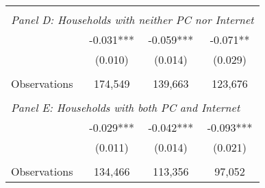 {\begin{tabular}{lccc}
&  &  &   \\
\multicolumn{4}{l}{\textit{Panel D: Households with neither PC nor Internet}} \\
\hspace{3mm}        &      -0.031***&      -0.059***&      -0.071** \\
                    &     (0.010)   &     (0.014)   &     (0.029)   \\
                    &               &               &               \\
\hspace{3mm}Observations&     174,549   &     139,663   &     123,676   \\
 
&  &  &   \\
\multicolumn{4}{l}{\textit{Panel E: Households with both PC and Internet}} \\
\hspace{3mm}        &      -0.029***&      -0.042***&      -0.093***\\
                    &     (0.011)   &     (0.014)   &     (0.021)   \\
                    &               &               &               \\
\hspace{3mm}Observations&     134,466   &     113,356   &      97,052   \\
 

\bottomrule
\end{tabular}
}
